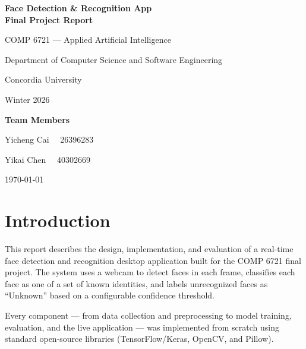 \documentclass[12pt,a4paper]{article}
\begin{document}
\begin{titlepage}
  \centering
  \vspace*{2cm}

  {\LARGE\bfseries Face Detection \& Recognition App\\[0.4em]
   Final Project Report\par}

  \vspace{1.5cm}

  {\large COMP 6721 — Applied Artificial Intelligence\par}
  \vspace{0.3cm}
  {\large Department of Computer Science and Software Engineering\par}
  {\large Concordia University\par}
  \vspace{0.3cm}
  {\large Winter 2026\par}

  \vspace{1.5cm}

  {\large\bfseries Team Members\par}
  \vspace{0.4cm}
  {\large Yicheng Cai \ \ 26396283\par}
  {\large Yikai Chen \ \ 40302669\par}

  \vfill

  {\normalsize\today\par}
\end{titlepage}

\tableofcontents
\newpage

\section{Introduction}

This report describes the design, implementation, and evaluation of a real-time face detection and recognition desktop application built for the COMP 6721 final project. The system uses a webcam to detect faces in each frame, classifies each face as one of a set of known identities, and labels unrecognized faces as ``Unknown'' based on a configurable confidence threshold.

Every component — from data collection and preprocessing to model training, evaluation, and the live application — was implemented from scratch using standard open-source libraries (TensorFlow/Keras, OpenCV, and Pillow).
\end{document}
